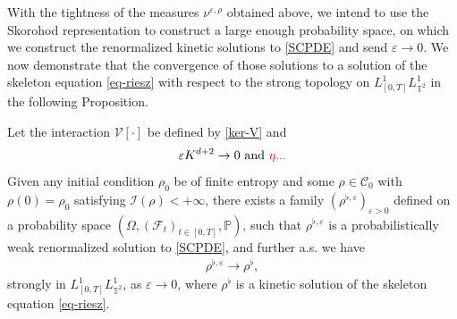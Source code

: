 With the tightness of the measures $\nu^{\varepsilon,\rho}$ obtained above, we intend to use the Skorohod representation to construct a large enough probability space, on which we construct the renormalized kinetic solutions to \eqref{SCPDE} and send $\varepsilon \to 0$.  We now demonstrate that the convergence of those solutions to a solution of the skeleton equation \eqref{eq-riesz} with respect to the strong topology on $L^{1}_{[0, T] } L^{1}_{\mathbb{T}^2}$ in the following Proposition. 

\begin{prop}\label{C1}Let the interaction $\mathcal{V}[\cdot]$ be defined by \eqref{ker-V} and 
\begin{align*}
\varepsilon K^{d+2}\rightarrow 0 \text{~and~} \textcolor{red}{\eta ...}
\end{align*}
Given any initial condition $\rho_{0}$ be of finite entropy and some $\rho\in \mathcal{C}_0$ with $\rho(0) = \rho_0$ satisfying $\mathcal{I}(\rho)<+\infty$, there exists a family $(\rho^{\flat,\varepsilon})_{\varepsilon > 0}$ defined on a probability space $(\Omega, (\mathcal{F}_t)_{t \in [0,T]},\mathbb{P})$, such that $\rho^{\flat,\varepsilon}$ is a probabilistically weak renormalized solution to \eqref{SCPDE}, and further a.s. we have
\begin{align}
\rho^{\flat,\varepsilon} \rightarrow \rho^{\flat},
\end{align}
strongly in $L^1_{[0,T]}L^1_{\mathbb{T}^2}$, as $\varepsilon \to 0$, where $\rho^{\flat}$ is a kinetic solution of the skeleton equation \eqref{eq-riesz}. 
\end{prop}
